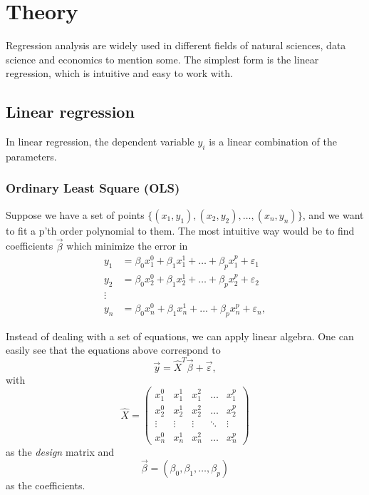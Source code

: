 \section{Theory} \label{sec:theory}
Regression analysis are widely used in different fields of natural sciences, data science and economics to mention some. The simplest form is the linear regression, which is intuitive and easy to work with. 
 
\subsection{Linear regression} \label{sec:regression}
In linear regression, the dependent variable $y_i$ is a linear combination of the parameters. \cite{Hastie}

\subsubsection{Ordinary Least Square (OLS)} \label{sec:OLS}
Suppose we have a set of points $\{(x_1, y_1), (x_2, y_2),\hdots, (x_n, y_n)\}$, and we want to fit a p'th order polynomial to them. The most intuitive way would be to find coefficients $\vec{\beta}$ which minimize the error in
\begin{align*}
y_1&=\beta_0x_1^0+\beta_1x_1^1+\hdots+\beta_px_1^p+\varepsilon_1\\
y_2&=\beta_0x_2^0+\beta_1x_2^1+\hdots+\beta_px_2^p+\varepsilon_2\\
\vdots\\
y_n&=\beta_0x_n^0+\beta_1x_n^1+\hdots+\beta_px_n^p+\varepsilon_n,
\end{align*}

Instead of dealing with a set of equations, we can apply linear algebra. One can easily see that the equations above correspond to
\begin{equation}
\vec{y}=\hat{X}^T\vec{\beta}+\vec{\varepsilon},
\label{eq:y_xb}
\end{equation}
with
\begin{equation}
\hat{X}=\begin{pmatrix}
x_1^0&x_1^1&x_1^2&\hdots&x_1^p\\
x_2^0&x_2^1&x_2^2&\hdots&x_2^p\\
\vdots&\vdots&\vdots&\ddots&\vdots\\
x_n^0&x_n^1&x_n^2&\hdots&x_n^p
\end{pmatrix}
\end{equation}
as the \textit{design} matrix and
\begin{equation}
\vec{\beta}=(\beta_0, \beta_1, \hdots, \beta_p)
\end{equation}
as the coefficients. 

